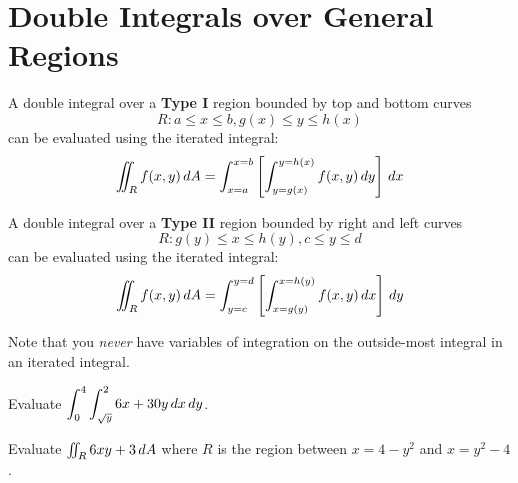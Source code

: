 \documentclass[letterpaper, twoside, 12pt]{book}
\begin{document}
\section{Double Integrals over General Regions} %

\begin{theorem}
  A double integral over a \textbf{Type I} region
  bounded by top and bottom curves
    \[
      R: a\leq x\leq b, g(x)\leq y\leq h(x)
    \]
      can be evaluated using the iterated integral:
    \[
      \iint_R f(x,y)\,d{A}
        =
      \int_{x=a}^{x=b}\left[\int_{y=g(x)}^{y=h(x)} f(x,y)\,d{y}\right]\,d{x}
    \]
\end{theorem}

\begin{theorem}
  A double integral over a \textbf{Type II} region
  bounded by right and left curves
    \[
      R: g(y)\leq x\leq h(y), c\leq y\leq d
    \]
      can be evaluated using the iterated integral:
    \[
      \iint_R f(x,y)\,d{A}
        =
      \int_{y=c}^{y=d}\left[\int_{x=g(y)}^{x=h(y)} f(x,y)\,d{x}\right]\,d{y}
    \]
\end{theorem}

\begin{remark}
  Note that you \textit{never} have variables of integration on the
  outside-most integral in an iterated integral.
\end{remark}

          \begin{problem}
            Evaluate $\displaystyle\int_0^4\int_{\sqrt{y}}^2 6x+30y\,d{x}\,d{y}$.
          \end{problem}

          \begin{solution}

          \end{solution}

          \begin{contributors}

          \end{contributors}

          \begin{problem}
            Evaluate $\iint_R 6xy+3 \,d{A}$
            where $R$ is the region between $x=4-y^2$ and $x=y^2-4$.
          \end{problem}

          \begin{solution}

          \end{solution}
\end{document}
